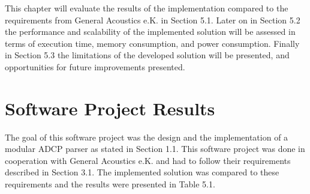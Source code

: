 

This chapter will evaluate the results of the implementation compared to the requirements from General Acoustics e.K. in Section 5.1. Later on in Section 5.2 the performance and scalability of the implemented solution will be assessed in terms of execution time, memory consumption, and power consumption. Finally in Section 5.3 the limitations of the developed solution will be presented, and opportunities for future improvements presented.

\section{Software Project Results}
The goal of this software project was the design and the implementation of a modular ADCP parser as stated in Section 1.1. This software project was done in cooperation with General Acoustics e.K. and had to follow their requirements described in Section 3.1. The implemented solution was compared to these requirements and the results were presented in Table 5.1.

